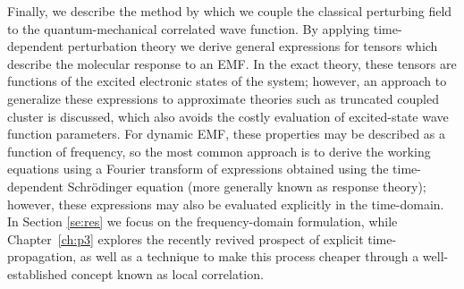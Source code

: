 Finally, we describe the method by which we couple the classical perturbing field to the 
quantum-mechanical correlated wave function. 
By applying time-dependent perturbation theory\cite{Langhoff} 
we derive general expressions for tensors which describe 
the molecular response to an EMF. In the exact theory, these tensors are functions of the 
excited electronic states of the system; however, an approach to generalize 
these expressions to approximate theories such as truncated coupled cluster is discussed,
\cite{Koch1990,Pedersen1997,Christiansen1998,Norman2011}
which also avoids the costly evaluation of excited-state wave function parameters. 
For dynamic EMF, these properties may be 
described as a function of frequency, so the most common approach is to derive the working equations
using a Fourier transform of expressions obtained using the time-dependent Schr\"odinger equation 
(more generally known as response theory); however, these expressions may also be evaluated explicitly
in the time-domain.
\cite{Goings2018,Li2020}
In Section \ref{se:res} we focus on the frequency-domain formulation, while
Chapter~\ref{ch:p3} explores the recently revived prospect of explicit time-propagation, as well as a 
technique to make this process cheaper through a well-established concept known as 
local correlation.\cite{Werner2006} 
